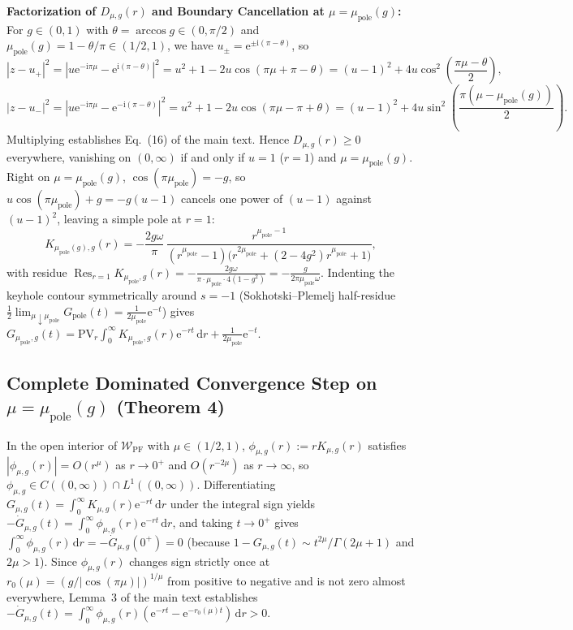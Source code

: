 \documentclass[onecolumn,10pt,notitlepage,amsmath,amssymb,floatfix]{revtex4-2}
\theoremstyle{plain}
\theoremstyle{definition}
\newcommand{\dd}{\mathrm{d}}
\newcommand{\ii}{\mathrm{i}}
\newcommand{\ee}{\mathrm{e}}
\newcommand{\mupole}{\mu_{\mathrm{pole}}}
\begin{document}
\textbf{Factorization of $D_{\mu,g}(r)$ and Boundary Cancellation at $\mu = \mupole(g)$:}
For $g \in (0,1)$ with $\theta = \arccos g \in (0, \pi/2)$ and $\mupole(g) = 1 - \theta/\pi \in (1/2, 1)$, we have $u_\pm = \ee^{\pm\ii(\pi-\theta)}$, so
\[
|z - u_+|^2 = |u\ee^{-\ii\pi\mu} - \ee^{\ii(\pi-\theta)}|^2 = u^2 + 1 - 2u\cos(\pi\mu + \pi - \theta) = (u-1)^2 + 4u\cos^2\!\left(\frac{\pi\mu - \theta}{2}\right),
\]
\[
|z - u_-|^2 = |u\ee^{-\ii\pi\mu} - \ee^{-\ii(\pi-\theta)}|^2 = u^2 + 1 - 2u\cos(\pi\mu - \pi + \theta) = (u-1)^2 + 4u\sin^2\!\left(\frac{\pi(\mu - \mupole(g))}{2}\right).
\]
Multiplying establishes Eq.~(16) of the main text. Hence $D_{\mu,g}(r) \ge 0$ everywhere, vanishing on $(0,\infty)$ if and only if $u = 1$ ($r=1$) and $\mu = \mupole(g)$. Right on $\mu = \mupole(g)$, $\cos(\pi\mupole) = -g$, so $u\cos(\pi\mupole) + g = -g(u-1)$ cancels one power of $(u-1)$ against $(u-1)^2$, leaving a simple pole at $r = 1$:
\begin{equation}
\label{eq:S2_K_pole_boundary}
K_{\mupole(g),g}(r) = -\frac{2g\omega}{\pi}\,\frac{r^{\mupole-1}}{(r^{\mupole}-1)\big(r^{2\mupole} + (2-4g^2)r^{\mupole} + 1\big)},
\end{equation}
with residue $\operatorname{Res}_{r=1} K_{\mupole,g}(r) = -\frac{2g\omega}{\pi\cdot\mupole\cdot 4(1-g^2)} = -\frac{g}{2\pi\mupole\omega}$. Indenting the keyhole contour symmetrically around $s = -1$ (Sokhotski--Plemelj half-residue $\frac{1}{2}\lim_{\mu\downarrow\mupole}G_{\mathrm{pole}}(t) = \frac{1}{2\mupole}\ee^{-t}$) gives $G_{\mupole,g}(t) = \mathrm{PV}_r\!\int_0^\infty K_{\mupole,g}(r)\ee^{-rt}\,\dd r + \frac{1}{2\mupole}\ee^{-t}$.

\subsection{Complete Dominated Convergence Step on \texorpdfstring{$\mu = \mupole(g)$}{mu = mu\_pole(g)} (Theorem 4)}

In the open interior of $\mathcal{W}_{\mathrm{PF}}$ with $\mu \in (1/2, 1)$, $\phi_{\mu,g}(r) := r K_{\mu,g}(r)$ satisfies $|\phi_{\mu,g}(r)| = O(r^\mu)$ as $r \to 0^+$ and $O(r^{-2\mu})$ as $r \to \infty$, so $\phi_{\mu,g} \in C((0,\infty)) \cap L^1((0,\infty))$. Differentiating $G_{\mu,g}(t) = \int_0^\infty K_{\mu,g}(r)\ee^{-rt}\,\dd r$ under the integral sign yields $-\dot{G}_{\mu,g}(t) = \int_0^\infty \phi_{\mu,g}(r)\ee^{-rt}\,\dd r$, and taking $t \to 0^+$ gives $\int_0^\infty \phi_{\mu,g}(r)\,\dd r = -\dot{G}_{\mu,g}(0^+) = 0$ (because $1 - G_{\mu,g}(t) \sim t^{2\mu}/\Gamma(2\mu+1)$ and $2\mu > 1$). Since $\phi_{\mu,g}(r)$ changes sign strictly once at $r_0(\mu) = (g/|\cos(\pi\mu)|)^{1/\mu}$ from positive to negative and is not zero almost everywhere, Lemma~3 of the main text establishes $-\dot{G}_{\mu,g}(t) = \int_0^\infty \phi_{\mu,g}(r)(\ee^{-rt}-\ee^{-r_0(\mu)t})\,\dd r > 0$.
\end{document}
